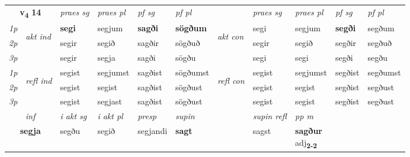 \noindent
\begin{tabular}{lllllllllll} \toprule
\multicolumn{2}{c}{\textbf{v{\textsubscript{4}}} \Large{\textbf{14}}}  &  \textit{praes sg}  & \textit{praes pl}  &\textit{ pf sg} & \textit{pf pl} &  &  \textit{praes sg}  & \textit{praes pl}  & \textit{pf sg} & \textit{pf pl } \\*
	\cmidrule{3-6} \cmidrule{8-11}
 {\textit{1p}} & \multirow{3}{*}{\begin{turn}{90}\textit{akt ind}\end{turn}} & \textbf{segi} & segjum & \textbf{sagði} & \textbf{sögðum} & \multirow{3}{*}{\begin{turn}{90}\textit{akt con}\end{turn}} &segi & segjum & \textbf{segði} & segðum\\*
 {\textit{2p}} &  &  segir  & segið & sagðir & sögðuð & & segir & segið & segðir & segðuð \\*
{\textit{3p}} &  & segir & segja & sagði & sögðu & & segi & segi& segði & segðu \\*
\cmidrule{3-6} \cmidrule{8-11}
 {\textit{1p}} & \multirow{3}{*}{\begin{turn}{90}\textit{refl ind}\end{turn}}  & segist & segjumst & sagðist & sögðumst & \multirow{3}{*}{\begin{turn}{90}\textit{refl con}\end{turn}}  &segist & segjumst & segðist & segðumst \\*
 {\textit{2p}} &  & segist & segist & sagðist & sögðust & &segist & segist & segðist & segðust \\*
 {\textit{3p}}  & & segist & segjast & sagðist & sögðust & & segist & segist& segðist & segðust \\*
\cmidrule{3-6} \cmidrule{8-11}

   \multicolumn{2}{c}{\textit{inf}}  & \textit{i akt sg} & \textit{i akt pl}   & \textit{presp} & \textit{supin} && \textit{supin refl} & \textit{pp m} \\*
  \multicolumn{2}{c}{\textbf{segja}} & segðu  & segið   & segjandi &  \textbf{sagt} && sagst & \specialcell{\textbf{sagður} \\ adj\textbf{\textsubscript{2-2}}} \\*
\end{tabular}

